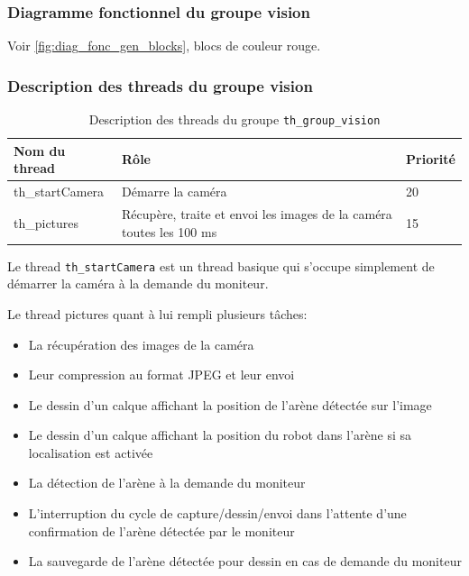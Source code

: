 \documentclass[11pt, a4paper]{paper}
\begin{document}
\subsubsection{Diagramme fonctionnel du groupe vision}
Voir \ref{fig:diag_fonc_gen_blocks}, {\color{red} blocs de couleur rouge}.

\subsubsection{Description des threads du groupe vision}

\begin{table}[H]
\begin{center}
\begin{tabular}{|p{3cm}|p{8.5cm}|p{2cm}|}
\hline
\bf Nom du thread &	\bf Rôle &	\bf Priorité \\
\hline
\hline
th\_startCamera & Démarre la caméra & 20\\
\hline
th\_pictures & Récupère, traite et envoi les images de la caméra toutes les 100 ms & 15\\
\hline

\end{tabular}
\end{center}
\caption{Description des threads du groupe {\tt th\_group\_vision}}
\label{tab:gt_vision}
\end{table}

Le thread {\tt th\_startCamera} est un thread basique qui s'occupe simplement de démarrer la caméra à la demande du moniteur.

Le thread pictures quant à lui rempli plusieurs tâches:
\begin{itemize}
    \item La récupération des images de la caméra
    \item Leur compression au format JPEG et leur envoi
    \item Le dessin d'un calque affichant la position de l'arène détectée sur l'image
    \item Le dessin d'un calque affichant la position du robot dans l'arène si sa localisation est activée
    \item La détection de l'arène à la demande du moniteur
    \item L'interruption du cycle de capture/dessin/envoi dans l'attente d'une confirmation de l'arène détectée par le moniteur
    \item La sauvegarde de l'arène détectée pour dessin en cas de demande du moniteur
\end{itemize}
\end{document}
